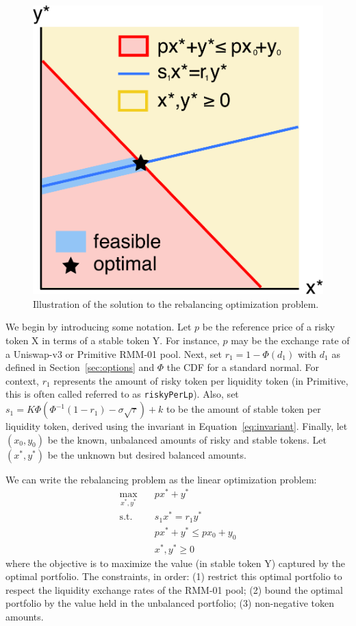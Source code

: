 \documentclass[hidelinks, 12pt]{article}
\begin{document}
\begin{figure}[h!]
    \centering
    \includegraphics[width=0.5\linewidth]{rebalance.pdf}
    \caption{Illustration of the solution to the rebalancing optimization problem.}
    \label{fig:rebalance}
\end{figure}

We begin by introducing some notation. Let $p$ be the reference price of a risky token X in terms of a stable token Y. For instance, $p$ may be the exchange rate of a Uniswap-v3 or Primitive RMM-01 pool. Next, set $r_1 = 1 - \Phi(d_1)$ with $d_1$ as defined in Section~\ref{sec:options} and $\Phi$ the CDF for a standard normal. For context, $r_1$ represents the amount of risky token per liquidity token (in Primitive, this is often called referred to as \texttt{riskyPerLp}). Also, set $s_1 = K\Phi(\Phi^{-1}(1-r_1)-\sigma\sqrt{\tau}) + k$ to be the amount of stable token per liquidity token, derived using the invariant in Equation~\ref{eq:invariant}. Finally, let $(x_0, y_0)$ be the known, unbalanced  amounts of risky and stable tokens. Let $(x^*, y^*)$ be the unknown but desired balanced amounts.

We can write the rebalancing problem as the linear optimization problem:
\begin{equation}
    \begin{aligned}
        \max_{x^*, y^*}  \quad & p x^* + y^* \\
        \textrm{s.t.} \quad & s_1 x^* = r_1 y^* \\
        &  p x^* + y^* \leq p x_0 + y_0 \\
        & x^*, y^* \geq 0
    \end{aligned}
    \label{eq:rebalance}
\end{equation}
where the objective is to maximize the value (in stable token Y) captured by the optimal portfolio. The constraints, in order: (1) restrict this optimal portfolio to respect the liquidity exchange rates of the RMM-01 pool; (2) bound the optimal portfolio by the value held in the unbalanced portfolio; (3) non-negative token amounts.
\end{document}
